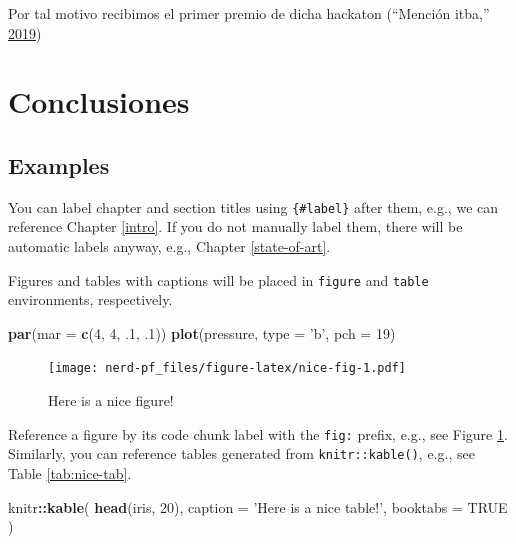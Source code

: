 \documentclass[12pt,a4paper,]{scrartcl}
\newenvironment{Shaded}{\begin{snugshade}}{\end{snugshade}}
\newcommand{\DataTypeTok}[1]{\textcolor[rgb]{0.13,0.29,0.53}{#1}}
\newcommand{\DecValTok}[1]{\textcolor[rgb]{0.00,0.00,0.81}{#1}}
\newcommand{\FloatTok}[1]{\textcolor[rgb]{0.00,0.00,0.81}{#1}}
\newcommand{\KeywordTok}[1]{\textcolor[rgb]{0.13,0.29,0.53}{\textbf{#1}}}
\newcommand{\NormalTok}[1]{#1}
\newcommand{\OperatorTok}[1]{\textcolor[rgb]{0.81,0.36,0.00}{\textbf{#1}}}
\newcommand{\OtherTok}[1]{\textcolor[rgb]{0.56,0.35,0.01}{#1}}
\newcommand{\StringTok}[1]{\textcolor[rgb]{0.31,0.60,0.02}{#1}}
\begin{document}
Por tal motivo recibimos el primer premio de dicha hackaton (``Mención itba,'' \protect\hyperlink{ref-mediaparty2019_win}{2019})

\newpage

\hypertarget{conclusiones}{%
\section{Conclusiones}\label{conclusiones}}

\hypertarget{examples}{%
\subsection{Examples}\label{examples}}

You can label chapter and section titles using \texttt{\{\#label\}} after them, e.g., we can reference Chapter \ref{intro}. If you do not manually label them, there will be automatic labels anyway, e.g., Chapter \ref{state-of-art}.

Figures and tables with captions will be placed in \texttt{figure} and \texttt{table} environments, respectively.

\begin{Shaded}
\begin{Highlighting}[]
\KeywordTok{par}\NormalTok{(}\DataTypeTok{mar =} \KeywordTok{c}\NormalTok{(}\DecValTok{4}\NormalTok{, }\DecValTok{4}\NormalTok{, }\FloatTok{.1}\NormalTok{, }\FloatTok{.1}\NormalTok{))}
\KeywordTok{plot}\NormalTok{(pressure, }\DataTypeTok{type =} \StringTok{'b'}\NormalTok{, }\DataTypeTok{pch =} \DecValTok{19}\NormalTok{)}
\end{Highlighting}
\end{Shaded}

\begin{figure}

{\centering \texttt{[image: nerd-pf\_files/figure-latex/nice-fig-1.pdf]} 

}

\caption{Here is a nice figure!}\label{fig:nice-fig}
\end{figure}

Reference a figure by its code chunk label with the \texttt{fig:} prefix, e.g., see Figure \ref{fig:nice-fig}. Similarly, you can reference tables generated from \texttt{knitr::kable()}, e.g., see Table \ref{tab:nice-tab}.

\begin{Shaded}
\begin{Highlighting}[]
\NormalTok{knitr}\OperatorTok{::}\KeywordTok{kable}\NormalTok{(}
  \KeywordTok{head}\NormalTok{(iris, }\DecValTok{20}\NormalTok{), }\DataTypeTok{caption =} \StringTok{'Here is a nice table!'}\NormalTok{,}
  \DataTypeTok{booktabs =} \OtherTok{TRUE}
\NormalTok{)}
\end{Highlighting}
\end{Shaded}
\end{document}
